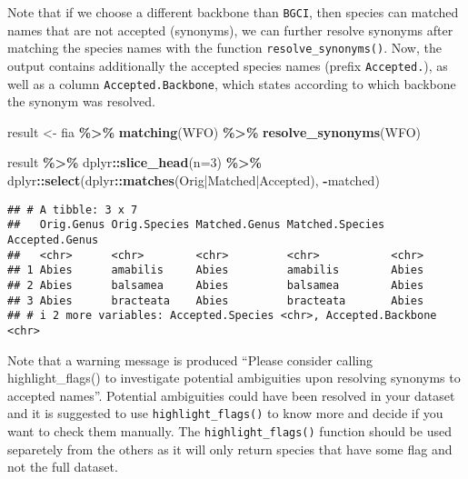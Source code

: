 \documentclass[
  11pt,
]{article}
\newenvironment{Shaded}{\begin{snugshade}}{\end{snugshade}}
\newcommand{\AttributeTok}[1]{\textcolor[rgb]{0.13,0.29,0.53}{#1}}
\newcommand{\DecValTok}[1]{\textcolor[rgb]{0.00,0.00,0.81}{#1}}
\newcommand{\FunctionTok}[1]{\textcolor[rgb]{0.13,0.29,0.53}{\textbf{#1}}}
\newcommand{\NormalTok}[1]{#1}
\newcommand{\OtherTok}[1]{\textcolor[rgb]{0.56,0.35,0.01}{#1}}
\newcommand{\SpecialCharTok}[1]{\textcolor[rgb]{0.81,0.36,0.00}{\textbf{#1}}}
\newcommand{\StringTok}[1]{\textcolor[rgb]{0.31,0.60,0.02}{#1}}
\begin{document}
\noindent Note that if we choose a different backbone than \verb|BGCI|,
then species can matched names that are not accepted (synonyms), we can
further resolve synonyms after matching the species names with the
function \verb|resolve_synonyms()|. Now, the output contains
additionally the accepted species names (prefix \verb|Accepted.|), as
well as a column \verb|Accepted.Backbone|, which states according to
which backbone the synonym was resolved.

\begin{Shaded}
\begin{Highlighting}[]
\NormalTok{result }\OtherTok{\textless{}{-}}\NormalTok{ fia }\SpecialCharTok{\%\textgreater{}\%} 
  \FunctionTok{matching}\NormalTok{(}\StringTok{\textquotesingle{}WFO\textquotesingle{}}\NormalTok{) }\SpecialCharTok{\%\textgreater{}\%} 
  \FunctionTok{resolve\_synonyms}\NormalTok{(}\StringTok{\textquotesingle{}WFO\textquotesingle{}}\NormalTok{)}
\end{Highlighting}
\end{Shaded}

\begin{Shaded}
\begin{Highlighting}[]
\NormalTok{result }\SpecialCharTok{\%\textgreater{}\%} 
\NormalTok{  dplyr}\SpecialCharTok{::}\FunctionTok{slice\_head}\NormalTok{(}\AttributeTok{n=}\DecValTok{3}\NormalTok{) }\SpecialCharTok{\%\textgreater{}\%} 
\NormalTok{  dplyr}\SpecialCharTok{::}\FunctionTok{select}\NormalTok{(dplyr}\SpecialCharTok{::}\FunctionTok{matches}\NormalTok{(}\StringTok{\textquotesingle{}Orig|Matched|Accepted\textquotesingle{}}\NormalTok{), }\SpecialCharTok{{-}}\StringTok{\textquotesingle{}matched\textquotesingle{}}\NormalTok{)}
\end{Highlighting}
\end{Shaded}

\begin{verbatim}
## # A tibble: 3 x 7
##   Orig.Genus Orig.Species Matched.Genus Matched.Species Accepted.Genus
##   <chr>      <chr>        <chr>         <chr>           <chr>         
## 1 Abies      amabilis     Abies         amabilis        Abies         
## 2 Abies      balsamea     Abies         balsamea        Abies         
## 3 Abies      bracteata    Abies         bracteata       Abies         
## # i 2 more variables: Accepted.Species <chr>, Accepted.Backbone <chr>
\end{verbatim}

\noindent Note that a warning message is produced ``Please consider
calling highlight\_flags() to investigate potential ambiguities upon
resolving synonyms to accepted names''. Potential ambiguities could have
been resolved in your dataset and it is suggested to use
\verb|highlight_flags()| to know more and decide if you want to check
them manually. The \verb|highlight_flags()| function should be used
separetely from the others as it will only return species that have some
flag and not the full dataset.
\end{document}
